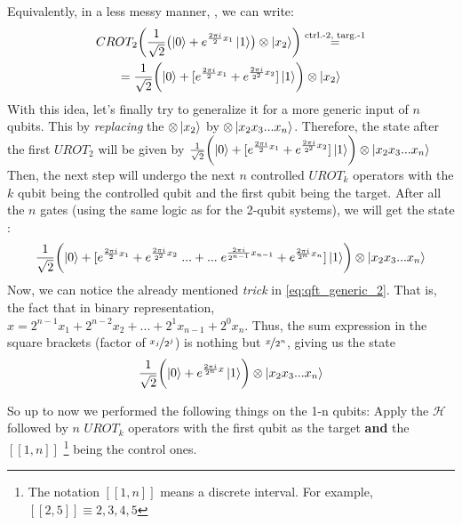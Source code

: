 Equivalently, in a less messy manner, \cite{noauthor_quantum_nodate}, we can write:
\begin{gather}
  CROT_2\biggl(\frac{1}{\sqrt{2}} \bigl(\ket{0}+e^{\frac{2\pi i}{2}x_1}\ket{1}\bigr)\otimes \ket{x_2}\biggr)\stackrel{\text{ctrl.-2, targ.-1}}{=}\\ 
  = \frac{1}{\sqrt{2}}\biggl( \ket{0}+ [e^{\frac{2\pi i}{2}x_1} + e^{\frac{2\pi i}{2^2}x_2}]\ket{1}\biggr) \otimes \ket{x_2}
\end{gather}
With this idea, let's finally try to generalize it for a more generic input of $n$ qubits.
This by \textit{replacing} the $\otimes\ket{x_2}$ by $\otimes \ket{x_2x_3...x_n}$.
Therefore, the state after the first $UROT_2$ will be given by 
$\frac{1}{\sqrt{2}}\biggl( \ket{0}+ [e^{\frac{2\pi i}{2}x_1} + e^{\frac{2\pi i}{2^2}x_2}]\ket{1}\biggr) \otimes \ket{x_2x_3...x_n}$
Then, the next step will undergo the next $n$ controlled $UROT_k$ operators with the $k$ qubit being the controlled qubit and 
the first qubit being the target. After all the $n$ gates (using the same logic as for the 2-qubit systems), we will get the 
state \cite{noauthor_quantum_nodate}:
\begin{gather}
\frac{1}{\sqrt{2}}\biggl( \ket{0}+ [e^{\frac{2\pi i}{2}x_1} + 
e^{\frac{2\pi i}{2^2}x_2}\;...+...\; e^{\frac{2\pi i}{2^{n-1}}x_{n-1}} + e^{\frac{2\pi i}{2^{n}}x_{n}}]\ket{1}\biggr) \otimes \ket{x_2x_3...x_n}
\end{gather}
Now, we can notice the already mentioned \textit{trick} in \autoref{eq:qft_generic_2}. That is, the fact that 
in binary representation, $x=2^{n-1}x_1+2^{n-2}x_2 + ...+ 2^1x_{n-1} + 2^0x_n$. Thus, the sum expression in the square 
brackets (factor of $\nicefrac{x_j}{2^j}$) is nothing but $\nicefrac{x}{2^n}$, giving us the state 
\begin{gather}
  \frac{1}{\sqrt{2}}\biggl( \ket{0}+e^{\frac{2\pi i}{2^n}x}\ket{1}\biggr) \otimes \ket{x_2x_3...x_n}
  \label{eq:qft_2nd_generic_step}
\end{gather}

So up to now we performed the following things on the 1-n qubits: Apply the $\mathcal{H}$ followed by $n$ $UROT_k$ operators with 
the first qubit as the target \textbf{and} the $[\![1,n]\!]$ \footnote{The notation $[\![1,n]\!]$ means a discrete 
interval. For example, $[\![2,5]\!] \equiv 2,3,4,5$} being the control ones. 

